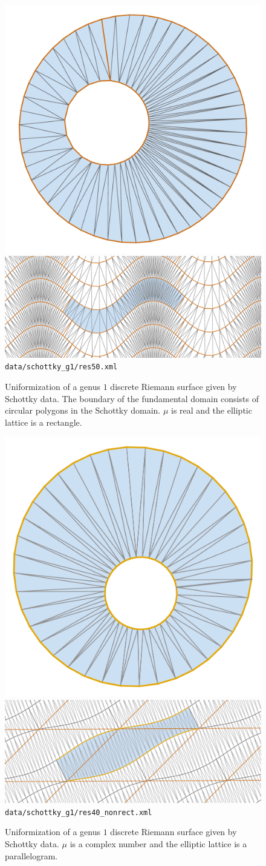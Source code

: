 \documentclass[Thesis.tex]{subfiles}
\begin{document}
\begin{figure} \centering
\includegraphics[width=0.28\linewidth]{data/schottky_g1/res50_image} \quad
\includegraphics[width=0.68\linewidth]{data/schottky_g1/res50_cover}
{\scriptsize\tt data/schottky\_g1/res50.xml} 
\caption{Uniformization of a genus $1$ discrete Riemann surface given by
Schottky data.  The boundary of the fundamental domain consists of circular
polygons in the Schottky domain.  $\mu$ is real and the elliptic lattice is a
rectangle.} 
\label{fig:fuchsian_to_schottky_genus1} 
\end{figure}

\begin{figure} 
\centering
\includegraphics[width=0.28\linewidth]{data/schottky_g1/res40_nonrect_image}
\quad
\includegraphics[width=0.68\linewidth]{data/schottky_g1/res40_nonrect_cover}
{\scriptsize\tt data/schottky\_g1/res40\_nonrect.xml} 
\caption{Uniformization of a genus $1$ discrete Riemann surface given by
Schottky data. $\mu$ is a complex number and the elliptic lattice is a
parallelogram.} 
\label{fig:fuchsian_to_schottky_genus1} 
\end{figure}
\end{document}

